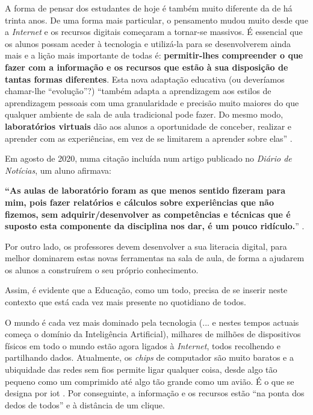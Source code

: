 A forma de pensar dos estudantes de hoje é também muito diferente da de há trinta anos. De uma forma mais particular, o pensamento mudou muito desde que a \textit{Internet} e os recursos digitais começaram a tornar-se massivos.
É essencial que os alunos possam aceder à tecnologia e utilizá-la para se desenvolverem ainda mais e a lição mais importante de todas é: \textbf{permitir-lhes compreender o que fazer com a informação e os recursos que estão à sua disposição de tantas formas diferentes}.
Esta nova adaptação educativa (ou deveríamos chamar-lhe ``evolução''?) ``também adapta a aprendizagem aos estilos de aprendizagem pessoais com uma granularidade e precisão muito maiores do que qualquer ambiente de sala de aula tradicional pode fazer. Do mesmo modo, \textbf{laboratórios virtuais} dão aos alunos a oportunidade de conceber, realizar e aprender com as experiências, em vez de se limitarem a aprender sobre elas'' \cite{oecd_state_2021}.

Em agosto de 2020, numa citação incluída num artigo publicado no \textit{Diário de Notícias}, um aluno afirmava: 
\begin{center}
  \textbf{``As aulas de laboratório foram as que menos sentido fizeram para mim, pois fazer relatórios e cálculos sobre experiências que não fizemos, sem adquirir/desenvolver as competências e técnicas que é suposto esta componente da disciplina nos dar, é um pouco ridículo.}'' \cite{impactonegativocovid}.
\end{center}

Por outro lado, os professores devem desenvolver a sua literacia digital, para melhor dominarem estas novas ferramentas na sala de aula, de forma a ajudarem os alunos a construírem o seu próprio conhecimento.

Assim, é evidente que a Educação, como um todo, precisa de se inserir neste contexto que está cada vez mais presente no quotidiano de todos.

O mundo é cada vez mais dominado pela tecnologia (... e nestes tempos actuais começa o domínio da Inteligência Artificial), milhares de milhões de dispositivos físicos em todo o mundo estão agora ligados à \textit{Internet}, todos recolhendo e partilhando dados. Atualmente, os \textit{chips} de computador são muito baratos e a ubiquidade das redes sem fios permite ligar qualquer coisa, desde algo tão pequeno como um comprimido até algo tão grande como um avião. É o que se designa por \acrfull{iot} \cite{IoT}.
Por conseguinte, a informação e os recursos estão ``na ponta dos dedos de todos'' e à distância de um clique. 

